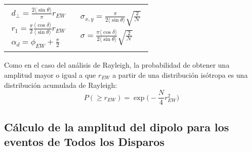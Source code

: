 \begin{tabular}{@{}p{.4\linewidth}@{}p{.5\linewidth}@{}}
    \begin{align}
        d_{\perp} = \frac{2\langle\sin\theta \rangle}{\pi} r_{EW} \label{dperp} \\
        r_1   =\frac{\pi}{2} \frac{\langle\cos\delta \rangle}{\langle\sin\theta \rangle} r_{EW} \label{r_fisico}  \\
        \alpha_d = \phi_{EW} + \frac{\pi}{2} \label{phase_fisico}
    \end{align}
    &    \begin{align}
        \sigma_{x,y} = \frac{\pi}{2\langle\sin\theta \rangle} \sqrt{\frac{2}{\mathcal{N}}}\\
        \sigma   = \frac{\pi \langle\cos\delta \rangle}{2\langle\sin\theta \rangle} \sqrt{\frac{2}{\mathcal{N}}}
    \end{align}
  \end{tabular}

Como en el caso del análisis de Rayleigh, la probabilidad de obtener una amplitud mayor o igual a que $r_{EW}$ a partir de una distribución isótropa es una distribución acumulada de Rayleigh:
\begin{equation}
    P(\geq r_{EW}) = \exp \Big(-\frac{N}{4}r^2_{EW}\Big) \label{p99}
\end{equation}

\subsection{Cálculo  de la amplitud del dipolo para los eventos de Todos los Disparos}

